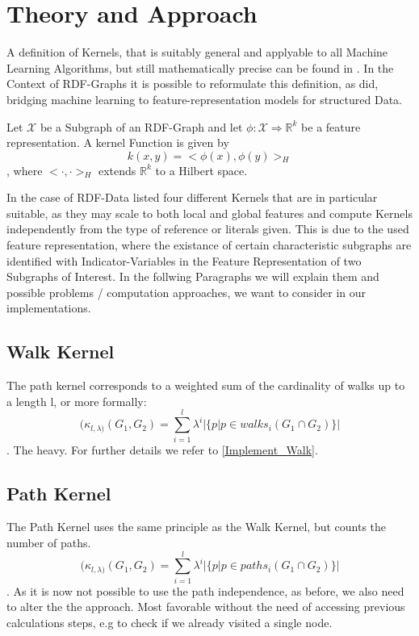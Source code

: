 
\section{Theory and Approach}
\label{drei}
A definition of Kernels, that is suitably general and applyable to all Machine Learning Algorithms, but still mathematically precise can be found in \citep{shawe}. In the Context of RDF-Graphs it is possible to reformulate this definition, as \citet{mainsource} did, bridging machine learning to feature-representation models for structured Data. 

\begin{Definition}
Let $\mathscr{X}$ be a Subgraph of an RDF-Graph and let $\phi: \mathscr{X} \Rightarrow \mathbb{R}^k$ be a feature representation. A kernel Function is given by \[k(x,y) = <\phi(x),\phi(y)>_H\], where $<\cdot,\cdot>_H $  extends $\mathbb{R}^k$ to a Hilbert space.
\end{Definition}

In the case of RDF-Data \citet{mainsource} listed four different Kernels that are in particular suitable, as they may scale to both local and global features and compute Kernels independently from the type of reference or literals given. This is due to the used feature representation, where the existance of certain characteristic subgraphs are identified with Indicator-Variables in the Feature Representation of two Subgraphs of Interest. 
In the follwing Paragraphs we will explain them and possible problems / computation approaches, we want to consider in our implementations.

\subsection{Walk Kernel}
The path kernel corresponds to a weighted sum of the cardinality of walks up to a length l, or more formally:
\[( \kappa_{l,\lambda)}(G_1,G_2)=\sum_{i=1}^l \lambda^i \big|\{p | p \in walks_i(G_1 \cap G_2) \} \big|  \] \cite{mainsource}. 
The heavy. For further details we refer to \ref{Implement_Walk}.

\subsection{Path Kernel}
The Path Kernel uses the same principle as the Walk Kernel, but counts the number of paths.
\[( \kappa_{l,\lambda)}(G_1,G_2)=\sum_{i=1}^l \lambda^i \big|\{p | p \in paths_i(G_1 \cap G_2) \} \big|  \] \cite{mainsource}. 
As it is now not possible to use the path independence, as before, we also need to alter the the approach. Most favorable without the need of accessing previous calculations steps, e.g to check if we already visited a single node. 

